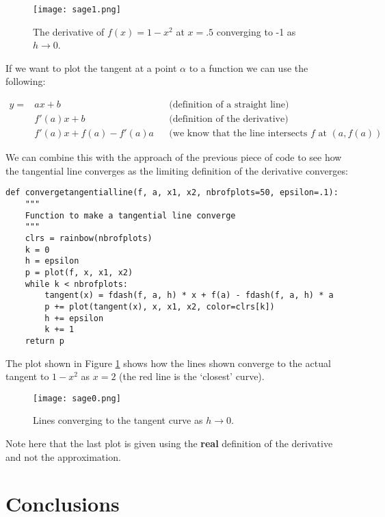 \documentclass[a4paper]{article}
\begin{document}
\begin{figure}[!htbp]
\begin{center}
\texttt{[image: sage1.png]}
\end{center}
\caption{The derivative of $f(x)=1-x^2$ at $x=.5$ converging to -1 as $h\to0$.}
\end{figure}

If we want to plot the tangent at a point $\alpha$ to a function we can use the following:

\begin{align}
y=&ax+b&&\text{(definition of a straight line)}\nonumber\\
  &f'(a)x+b&&\text{(definition of the derivative)}\nonumber\\
  &f'(a)x+f(a)-f'(a)a&&\text{(we know that the line intersects $f$ at $(a,f(a))$}\nonumber
\end{align}

We can combine this with the approach of the previous piece of code to see how the tangential line converges as the limiting definition of the derivative converges:

\begin{verbatim}
def convergetangentialline(f, a, x1, x2, nbrofplots=50, epsilon=.1):
    """
    Function to make a tangential line converge
    """
    clrs = rainbow(nbrofplots)
    k = 0
    h = epsilon
    p = plot(f, x, x1, x2)
    while k < nbrofplots:
        tangent(x) = fdash(f, a, h) * x + f(a) - fdash(f, a, h) * a
        p += plot(tangent(x), x, x1, x2, color=clrs[k])
        h += epsilon
        k += 1
    return p
\end{verbatim}

The plot shown in Figure \ref{lines} shows how the lines shown converge to the actual tangent to $1-x^2$ as $x=2$ (the red line is the `closest' curve).

\begin{figure}[!htbp]
\begin{center}
\texttt{[image: sage0.png]}
\end{center}
\caption{Lines converging to the tangent curve as $h\to0$.}\label{lines}
\end{figure}

Note here that the last plot is given using the \textbf{real} definition of the derivative and not the approximation.

\section{Conclusions}
\end{document}
